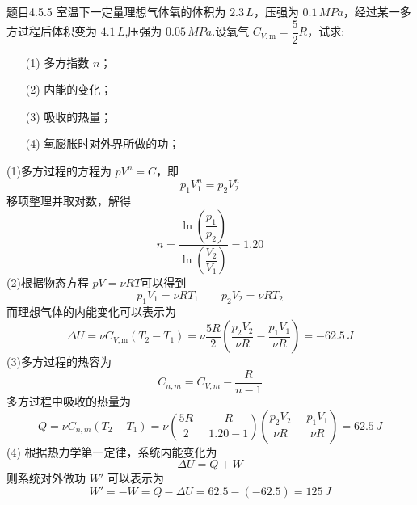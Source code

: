 \begin{question}{题目4.5.5}
    室温下一定量理想气体氧的体积为 $2.3 \,\si{L}$，压强为 $0.1 \,\si{MPa}$，经过某一多方过程后体积变为 $4.1 \,\si{L}$,压强为 $0.05 \,\si{MPa}$.设氧气 $C_{V, \mathrm{m}} = \dfrac{5}{2}R$，试求:
    \begin{enumerate}
        \item[(1)] 多方指数 $n$；
        \item[(2)] 内能的变化；
        \item[(3)] 吸收的热量；
        \item[(4)] 氧膨胀时对外界所做的功；
    \end{enumerate}
\end{question}
\begin{solution}
    (1)多方过程的方程为 $pV^n = C$，即
    $$
        p_1V_1^n =p_2V_2^n
    $$
    移项整理并取对数，解得
    $$
        n = \frac{
            \ln \left(\dfrac{p_1}{p_2}\right)
        }{
            \ln \left(\dfrac{V_2}{V_1}\right)
        }
        = 1.20
    $$
    (2)根据物态方程 $pV = \nu RT$可以得到
    $$
        p_1V_1 = \nu RT_1
        \quad \quad
        p_2V_2 = \nu RT_2
    $$
    而理想气体的内能变化可以表示为
    $$
        \Delta U
        = \nu C_{V,\mathrm{m}}(T_2 -T_1)
        = \nu \frac{5R}{2} \left(\frac{p_2V_2}{\nu R} - \frac{p_1V_1}{\nu R}\right)
        = -62.5 \,\si{J}
    $$
    (3)多方过程的热容为
    $$
        C_{n,m} = C_{V,m} - \frac{R}{n-1}
    $$
    多方过程中吸收的热量为
    $$
        Q = \nu C_{n,m} (T_2 - T_1)
        = \nu \left(\frac{5R}{2} - \frac{R}{1.20 - 1}\right) \left(\frac{p_2V_2}{\nu R} - \frac{p_1V_1}{\nu R}\right)
        = 62.5 \,\si{J}
    $$
    (4) 根据热力学第一定律，系统内能变化为
    $$
        \Delta U = Q + W
    $$
    则系统对外做功 $W'$ 可以表示为
    $$
        W' = -W = Q - \Delta{U} = 62.5 - (-62.5) = 125 \,\si{J}
    $$
\end{solution}

